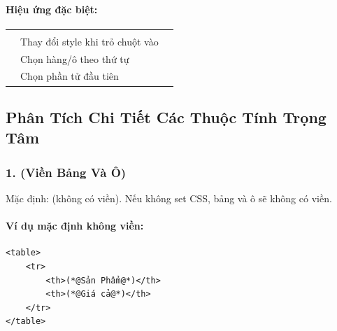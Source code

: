 \paragraph{Hiệu ứng đặc biệt:}
\begin{prettyTableBox}
\begin{tabularx}{\linewidth}{K{3.2cm} Z K{4.5cm}}
 &  &  \\
 & Thay đổi style khi trỏ chuột vào &  \\
 & Chọn hàng/ô theo thứ tự &  \\
 & Chọn phần tử đầu tiên &  \\
\end{tabularx}
\end{prettyTableBox}

\subsection{Phân Tích Chi Tiết Các Thuộc Tính Trọng Tâm}

\subsubsection{1.  (Viền Bảng Và Ô)}

Mặc định:  (không có viền). Nếu không set CSS, bảng và ô sẽ không có viền.

\paragraph{Ví dụ mặc định không viền:}
\begin{codeWindow}
\begin{lstlisting}[language=HTML5]
<table>
    <tr>
        <th>(*@Sản Phẩm@*)</th>      
        <th>(*@Giá cả@*)</th>
    </tr>
</table>
\end{lstlisting}
\end{codeWindow}


